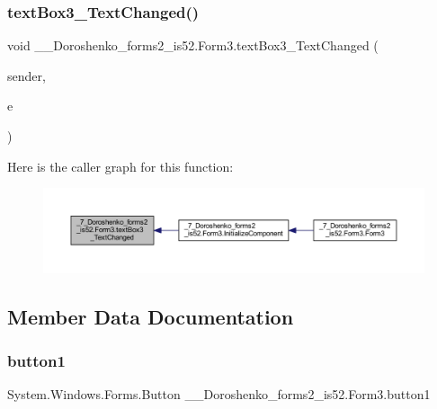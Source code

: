 \subsubsection{\texorpdfstring{text\+Box3\+\_\+\+Text\+Changed()}{textBox3\_TextChanged()}}
{\footnotesize\ttfamily void \+\_\+\_\+\+Doroshenko\+\_\+forms2\+\_\+is52.\+Form3.\+text\+Box3\+\_\+\+Text\+Changed (\begin{DoxyParamCaption}\item[{object}]{sender,  }\item[{Event\+Args}]{e }\end{DoxyParamCaption})\hspace{0.3cm}{\ttfamily [private]}}

Here is the caller graph for this function\+:
\nopagebreak
\begin{figure}[H]
\begin{center}
\leavevmode
\includegraphics[width=350pt]{class__7___doroshenko__forms2__is52_1_1_form3_ad5c48d9a356af6c3e3a9a727ec5c3898_icgraph}
\end{center}
\end{figure}


\subsection{Member Data Documentation}
\hypertarget{class__7___doroshenko__forms2__is52_1_1_form3_a9be226029548bc97f54780024e84807e}{}\label{class__7___doroshenko__forms2__is52_1_1_form3_a9be226029548bc97f54780024e84807e} 
\subsubsection{\texorpdfstring{button1}{button1}}
{\footnotesize\ttfamily System.\+Windows.\+Forms.\+Button \+\_\+\_\+\+Doroshenko\+\_\+forms2\+\_\+is52.\+Form3.\+button1\hspace{0.3cm}{\ttfamily [private]}}

